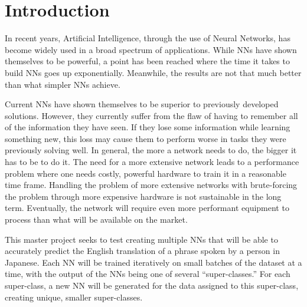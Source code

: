 \chapter{Introduction}






In recent years, Artificial Intelligence, through the use of Neural Networks, has become widely used in a broad spectrum of applications. 
While NNs have shown themselves to be powerful, a point has been reached where the time it takes to build NNs goes up exponentially. 
Meanwhile, the results are not that much better than what simpler NNs achieve.

Current NNs have shown themselves to be superior to previously developed solutions.
However, they currently suffer from the flaw of having to remember all of the information they have seen. 
If they lose some information while learning something new, this loss may cause them to perform worse in tasks they were previously solving well. 
In general, the more a network needs to do, the bigger it has to be to do it. 
The need for a more extensive network leads to a performance problem where one needs costly, powerful hardware to train it in a reasonable time frame. 
Handling the problem of more extensive networks with brute-forcing the problem through more expensive hardware is not sustainable in the long term. 
Eventually, the network will require even more performant equipment to process than what will be available on the market.

This master project seeks to test creating multiple NNs that will be able to accurately predict the English translation of a phrase spoken by a person in Japanese. 
Each NN will be trained iteratively on small batches of the dataset at a time, with the output of the NNs being one of several “super-classes.” 
For each super-class, a new NN will be generated for the data assigned to this super-class, creating unique, smaller super-classes.


